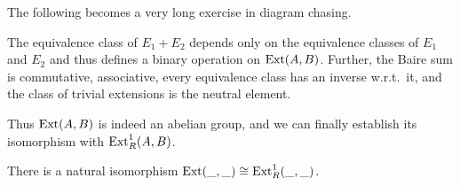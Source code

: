 The following becomes a very long exercise in diagram chasing.
\begin{prop}
    The equivalence class of $E_1+E_2$ depends only on the equivalence classes of $E_1$ and $E_2$ and thus defines a binary operation on $\operatorname{Ext}(A,B)$. Further, the Baire sum is commutative, associative, every equivalence class has an inverse w.r.t.\ it, and the class of trivial extensions is the neutral element.
\end{prop}

Thus $\operatorname{Ext}(A,B)$ is indeed an abelian group, and we can finally establish its isomorphism with $\operatorname{Ext}_R^1(A,B)$.

\begin{thm}
    There is a natural isomorphism $\operatorname{Ext}(\_,\_)\cong\operatorname{Ext}^1_R(\_,\_)$.
\end{thm}
